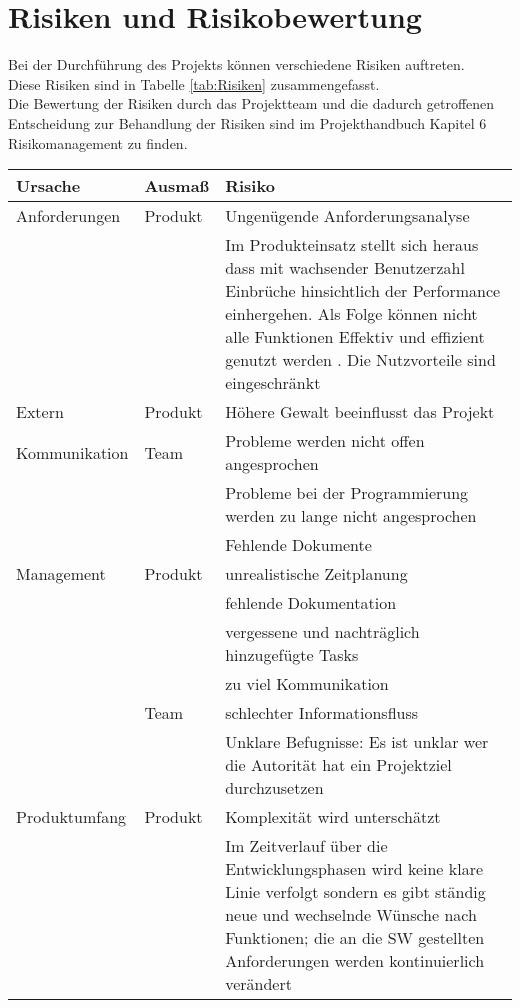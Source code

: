 \chapter{Risiken und Risikobewertung}
Bei der Durchführung des Projekts können verschiedene Risiken auftreten. \\
Diese Risiken sind in Tabelle \ref{tab:Risiken} zusammengefasst. \\
Die Bewertung der Risiken durch das Projektteam und die dadurch getroffenen Entscheidung zur Behandlung der Risiken sind im Projekthandbuch Kapitel 6 Risikomanagement zu finden.
\begin{table}
\centering
\scriptsize
\begin{tabularx}{\textwidth}{|l|l|X|} 
\hline
\textbf{Ursache} & \textbf{Ausmaß} & \textbf{Risiko} \\
\hline
Anforderungen & Produkt & Ungenügende Anforderungsanalyse  \\ 
\hline
 &  & Im Produkteinsatz stellt sich heraus  dass mit wachsender Benutzerzahl Einbrüche hinsichtlich der Performance einhergehen. Als Folge können nicht alle Funktionen Effektiv und effizient genutzt werden . Die Nutzvorteile sind eingeschränkt  \\ 
\hline
Extern & Produkt & Höhere Gewalt beeinflusst das Projekt  \\ 
\hline
Kommunikation & Team & Probleme werden nicht offen angesprochen \\ 
\hline
 &  & Probleme bei der Programmierung werden zu lange nicht angesprochen \\ 
\hline
 &  & Fehlende Dokumente\\ 
\hline
Management & Produkt & unrealistische Zeitplanung \\ 
\hline
 &  & fehlende Dokumentation \\ 
\hline
 &  & vergessene und nachträglich hinzugefügte Tasks \\ 
\hline
 &  & zu viel Kommunikation\\ 
\hline
 & Team & schlechter Informationsfluss \\ 
\hline
 &  & Unklare Befugnisse: Es ist unklar wer die Autorität hat ein Projektziel durchzusetzen  \\ 
\hline
Produktumfang & Produkt & Komplexität wird unterschätzt \\ 
\hline
 &  & Im Zeitverlauf über die Entwicklungsphasen wird keine klare Linie verfolgt sondern es gibt ständig neue und wechselnde Wünsche nach Funktionen; die an die SW gestellten Anforderungen werden kontinuierlich verändert\\ 

\end{tabularx}
\end{table}
